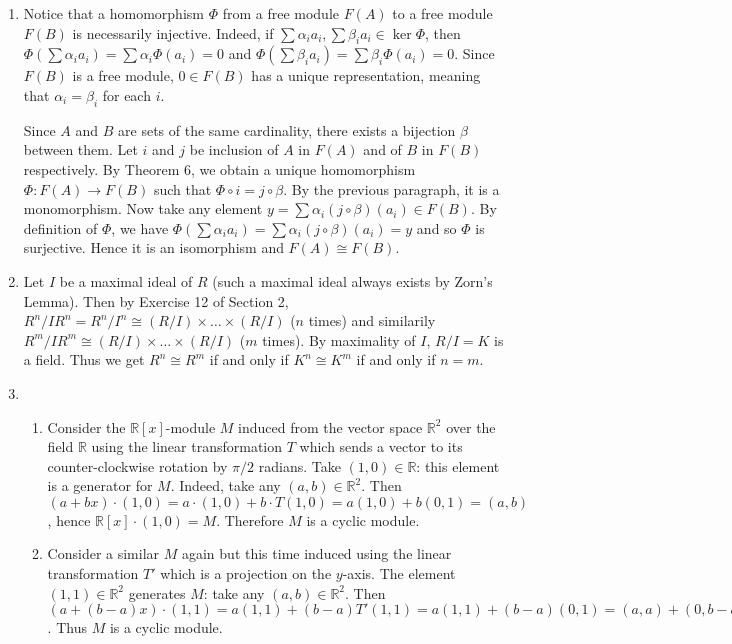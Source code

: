 \documentclass{report}
\begin{document}
\begin{enumerate}
\item
Notice that a homomorphism $\Phi$ from a free module $F(A)$ to a free module $F(B)$ is necessarily injective. Indeed, if $\sum\alpha_ia_i, \sum\beta_ia_i \in \ker\Phi$, then $\Phi(\sum\alpha_ia_i)=\sum\alpha_i\Phi(a_i)=0$ and $\Phi(\sum\beta_ia_i)=\sum\beta_i\Phi(a_i)=0$. Since $F(B)$ is a free module, $0\in F(B)$ has a unique representation, meaning that $\alpha_i=\beta_i$ for each $i$.

Since $A$ and $B$ are sets of the same cardinality, there exists a bijection $\beta$ between them. Let $i$ and $j$ be inclusion of $A$ in $F(A)$ and of $B$ in $F(B)$ respectively. By Theorem 6, we obtain a unique homomorphism $\Phi:F(A)\to F(B)$ such that $\Phi\circ i = j\circ\beta$. By the previous paragraph, it is a monomorphism. Now take any element $y=\sum\alpha_i(j\circ\beta)(a_i)\in F(B)$. By definition of $\Phi$, we have $\Phi(\sum\alpha_i a_i)=\sum\alpha_i(j\circ\beta)(a_i)=y$ and so $\Phi$ is surjective. Hence it is an isomorphism and $F(A)\cong F(B)$.

\item
Let $I$ be a maximal ideal of $R$ (such a maximal ideal always exists by Zorn's Lemma). Then by Exercise 12 of Section 2, $R^n/IR^n=R^n/I^n\cong (R/I)\times\dots\times(R/I)$ ($n$ times) and similarily $R^m/IR^m\cong (R/I)\times\dots\times(R/I)$ ($m$ times). By maximality of $I$, $R/I=K$ is a field. Thus we get $R^n\cong R^m$ if and only if $K^n\cong K^m$ if and only if $n=m$.

\item
\begin{enumerate}
\item
Consider the $\mathbb{R}[x]$-module $M$ induced from the vector space $\mathbb{R}^2$ over the field $\mathbb{R}$ using the linear transformation $T$ which sends a vector to its counter-clockwise rotation by $\pi/2$ radians. Take $(1,0)\in \mathbb{R}$: this element is a generator for $M$. Indeed, take any $(a,b)\in \mathbb{R}^2$. Then $(a+bx)\cdot(1,0) = a\cdot(1,0)+b\cdot T(1,0) = a(1,0)+b(0,1)=(a,b)$, hence $\mathbb{R}[x]\cdot(1,0)=M$. Therefore $M$ is a cyclic module.
\item
Consider a similar $M$ again but this time induced using the linear transformation $T'$ which is a projection on the $y$-axis. The element $(1,1)\in\mathbb{R}^2$ generates $M$: take any $(a,b)\in\mathbb{R}^2$. Then $(a+(b-a)x)\cdot(1,1)=a(1,1)+(b-a)T'(1,1)=a(1,1)+(b-a)(0,1)=(a,a)+(0,b-a)=(a,b)$. Thus $M$ is a cyclic module.
\end{enumerate}


\end{enumerate}
\end{document}
